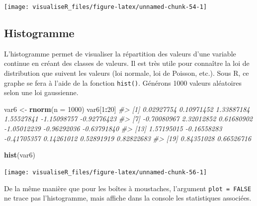 \documentclass[]{article}
\newenvironment{Shaded}{\begin{snugshade}}{\end{snugshade}}
\newcommand{\CommentTok}[1]{\textcolor[rgb]{0.56,0.35,0.01}{\textit{#1}}}
\newcommand{\DataTypeTok}[1]{\textcolor[rgb]{0.13,0.29,0.53}{#1}}
\newcommand{\DecValTok}[1]{\textcolor[rgb]{0.00,0.00,0.81}{#1}}
\newcommand{\KeywordTok}[1]{\textcolor[rgb]{0.13,0.29,0.53}{\textbf{#1}}}
\newcommand{\NormalTok}[1]{#1}
\newcommand{\OperatorTok}[1]{\textcolor[rgb]{0.81,0.36,0.00}{\textbf{#1}}}
\newcommand{\StringTok}[1]{\textcolor[rgb]{0.31,0.60,0.02}{#1}}
\begin{document}
\begin{center}\texttt{[image: visualiseR\_files/figure-latex/unnamed-chunk-54-1]} \end{center}

\hypertarget{histogramme}{%
\subsection{Histogramme}\label{histogramme}}

L'histogramme permet de visualiser la répartition des valeurs d'une variable continue en créant des classes de valeurs. Il est très utile pour connaître la loi
de distribution que suivent les valeurs (loi normale, loi de Poisson, etc.). Sous R, ce graphe se fera à l'aide de la fonction \texttt{hist()}.
Générons 1000 valeurs aléatoires selon une loi gaussienne.

\begin{Shaded}
\begin{Highlighting}[]
\NormalTok{var6 <-}\StringTok{ }\KeywordTok{rnorm}\NormalTok{(}\DataTypeTok{n =} \DecValTok{1000}\NormalTok{)}
\NormalTok{var6[}\DecValTok{1}\OperatorTok{:}\DecValTok{20}\NormalTok{]}
\CommentTok{#>  [1]  0.02927754  0.10971452  1.33887184  1.55527841 -1.15098757 -0.92776423}
\CommentTok{#>  [7] -0.70080967  2.32012852  0.61680902 -1.05012239 -0.96292036 -0.63791840}
\CommentTok{#> [13]  1.57195015 -0.16558283 -0.41705357  0.14261012  0.52891919  0.82822683}
\CommentTok{#> [19]  0.84351028  0.66526716}
\end{Highlighting}
\end{Shaded}

\begin{Shaded}
\begin{Highlighting}[]
\KeywordTok{hist}\NormalTok{(var6)}
\end{Highlighting}
\end{Shaded}

\begin{center}\texttt{[image: visualiseR\_files/figure-latex/unnamed-chunk-56-1]} \end{center}

De la même manière que pour les boîtes à moustaches, l'argument \texttt{plot\ =\ FALSE} ne trace pas l'histogramme, mais affiche dans la console les statistiques associées.
\end{document}
